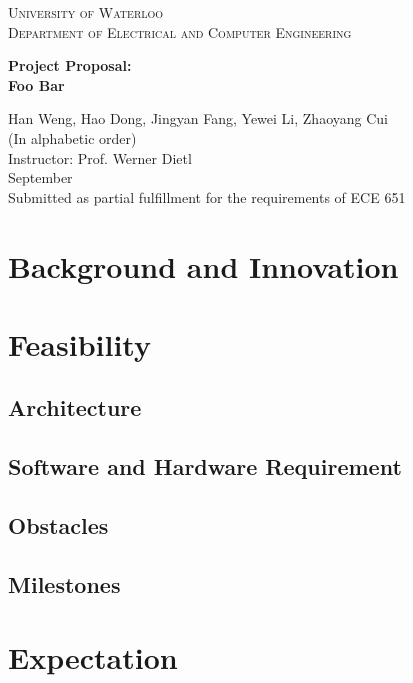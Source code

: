 \documentclass[12pt]{article}
\begin{document}
\begin{titlepage}
	\begin{center}
		{\hphantom{M}}
		\vspace{1cm}
		{\scshape\Huge{University of Waterloo}}\\
		\vspace{2cm}
		{\scshape\Large Department of Electrical and Computer Engineering}\\
		\vspace{1.5cm}
		\begin{spacing}{2.5}
		{\LARGE\bfseries Project Proposal:\\ Foo Bar}\\
		\end{spacing}
		\vspace{2cm}
		{\Large{Han Weng, Hao Dong, Jingyan Fang, Yewei Li, Zhaoyang Cui\\ (In alphabetic order) \vspace{1em} \\ Instructor: Prof. Werner Dietl}}
		\vspace{1cm}\\
		{\Large September}\\
		\vspace{4em}
		{\Large Submitted as partial fulfillment for the requirements of ECE 651}
	\end{center}
\end{titlepage}

\begin{spacing}{1.5}
\large
\tableofcontents
\end{spacing}
\newpage

\section{Background and Innovation}

\section{Feasibility}
\subsection{Architecture}
\subsection{Software and Hardware Requirement}
\subsection{Obstacles}
\subsection{Milestones}

\section{Expectation}
\end{document}
